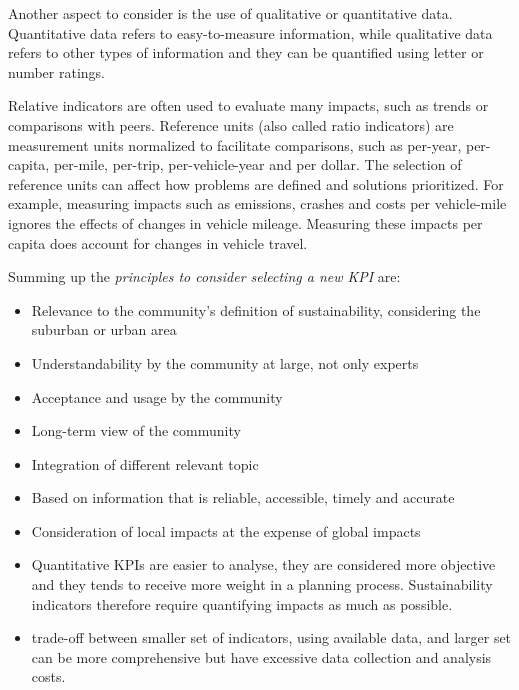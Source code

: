 Another aspect to consider is the use of qualitative or quantitative data. Quantitative data refers to easy-to-measure information, while qualitative data refers to other types of information and they can be quantified using letter or number ratings. 

Relative indicators are often used to evaluate many impacts, such as trends or comparisons with peers. Reference units (also called ratio indicators) are measurement units normalized to facilitate comparisons, such as per-year, per-capita, per-mile, per-trip, per-vehicle-year and per dollar. The selection of reference units can affect how problems are defined and solutions prioritized. For example, measuring impacts such as emissions, crashes and costs per vehicle-mile ignores the effects of changes in vehicle mileage. Measuring these impacts per capita does account for changes in vehicle travel.

Summing up the \emph{principles to consider selecting a new KPI} are:
\begin{itemize}
    \item Relevance to the community's definition of sustainability, considering the suburban or urban area
    \item Understandability by the community at large, not only experts
    \item Acceptance and usage by the community
    \item Long-term view of the community
    \item Integration of different relevant topic
    \item Based on information that is reliable, accessible, timely and accurate
    \item Consideration of local impacts at the expense of global impacts
    \item Quantitative KPIs are easier to analyse, they are considered more objective and they tends to receive more weight in a planning process. Sustainability indicators therefore require quantifying impacts as much as possible.
    \item trade-off between smaller set of indicators, using available data, and larger set can be more comprehensive but have excessive data collection and analysis costs. 
\end{itemize}

